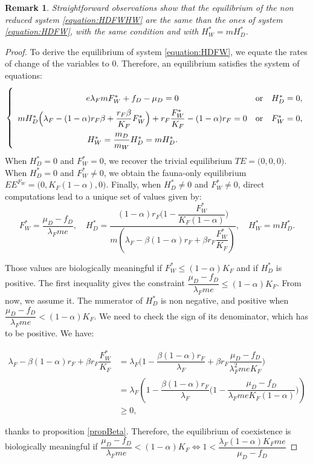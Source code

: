 \documentclass{article}
\newcommand{\lfw}{\lambda_{F}}
\newcommand{\lfw}{\lambda_{F}}
\newtheorem{remark}{Remark}
\begin{document}
\begin{remark}\label{remark:existence1}
Straightforward observations show that the equilibrium of the non reduced system \eqref{equation:HDFWHW} are the same than the ones of system \eqref{equation:HDFW}, with the same condition and with $H_W^* = m H_D^*$.
\end{remark}

\begin{proof}
To derive the equilibrium of system \eqref{equation:HDFW}, we equate the rates of change of the variables to 0. Therefore, an equilibrium satisfies the system of equations:
\begin{equation}\label{equation:system-equilibre, cI=0}
\def\arraystretch{2}
\left\lbrace \begin{array}{cll}
 e \lfw m F_W^* + f_D - \mu_D = 0& \mbox{or} & H_D^* = 0,\\
m H_D^*\Big(\lfw - (1-\alpha)r_F \beta + \dfrac{r_F \beta}{K_F}F_W^* \Big) + r_F \dfrac{F_W^*}{K_F} - (1-\alpha)r_F= 0& \mbox{or} & F^*_W = 0,\\
H_W^* = \dfrac{m_D}{m_W} H_D^* = m H_D^*.&&
\end{array} \right.
\end{equation}
When $H_D^*=0$ and $F_W^*=0$, we recover the trivial equilibrium $TE = \Big(0,0,0\Big)$. When $H_D^*=0$ and $F_W^*\neq0$, we obtain the fauna-only equilibrium $EE^{F_W} = \Big(0, K_F(1-\alpha), 0 \Big)$. Finally, when $H_D^*\neq0$ and $F_W^*\neq0$, direct computations lead to a unique set of values given by:
$$F^*_{W} = \dfrac{\mu_D - f_D}{\lfw m e},
\quad 
H^*_{D} = \dfrac{(1-\alpha)r_F\Big(1 - \dfrac{F^*_{W}}{K_F(1-\alpha)} \Big)}{m\left(\lfw - \beta (1-\alpha) r_F + \beta r_F  \dfrac{F^*_{W}}{K_F}\right)} ,
\quad 
H^*_{W} = m H^*_{D}.$$

Those values are biologically meaningful if $F_W^* \leq (1-\alpha) K_F$ and if $H_D^*$ is positive. The first inequality gives the constraint $\dfrac{\mu_D - f_D}{\lfw m e} \leq (1-\alpha)K_F$. From now, we assume it. The numerator of $H^*_{D}$ is non negative, and positive when $\dfrac{\mu_D - f_D}{\lfw m e} < (1-\alpha)K_F$. We need to check the sign of its denominator, which has to be positive. We have:

\begin{align*}
\lfw - \beta (1-\alpha) r_F + \beta r_F  \dfrac{F^*_{W}}{K_F} &= \lfw\Big(1 - \dfrac{\beta (1-\alpha) r_F}{\lfw} + \beta r_F  \dfrac{\mu_D - f_D}{\lfw^2 m e K_F} \Big) \\
&= \lfw\left(1 - \dfrac{\beta (1-\alpha) r_F}{\lfw}\Big(1 -\dfrac{\mu_D - f_D}{\lfw m e K_F(1-\alpha)} \Big) \right) \\
&\geq 0,
\end{align*}

thanks to proposition \ref{propBeta}. Therefore, the equilibrium of coexistence is biologically meaningful if $\dfrac{\mu_D - f_D}{\lfw m e} < (1-\alpha)K_F \Leftrightarrow 1 < \dfrac{\lfw (1-\alpha)K_F m e}{\mu_D - f_D}$

\end{proof}
\end{document}
